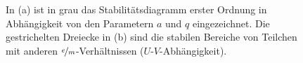 \begin{figure}[h]
	\centering
	\caption[Stabilitätsdiagramm]{In (a) ist in grau das Stabilitätsdiagramm erster
	Ordnung in Abhängigkeit von den Parametern $a$ und $q$ eingezeichnet. Die
	gestrichelten Dreiecke in (b) sind die stabilen Bereiche von Teilchen mit
	anderen $\nicefrac{e}{m}$-Verhältnissen ($U$-$V$-Abhängigkeit).}
	\label{fig:stabilitaetsdiagramm}
\end{figure}
